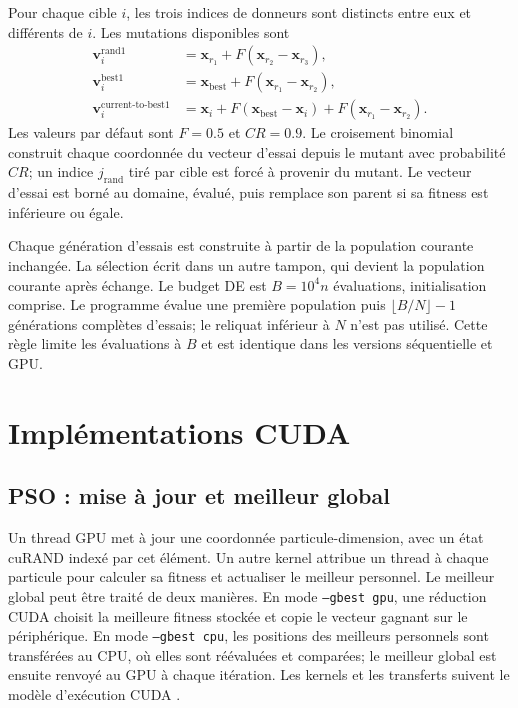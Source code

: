 \documentclass[conference]{IEEEtran}
\newcommand{\DE}{\textsc{DE}}
\begin{document}
Pour chaque cible $i$, les trois indices de donneurs sont distincts entre eux
et différents de $i$. Les mutations disponibles sont
\begin{align}
\mathbf{v}_i^{\mathrm{rand1}} &=
\mathbf{x}_{r_1}+F(\mathbf{x}_{r_2}-\mathbf{x}_{r_3}),\\
\mathbf{v}_i^{\mathrm{best1}} &=
\mathbf{x}_{\mathrm{best}}+F(\mathbf{x}_{r_1}-\mathbf{x}_{r_2}),\\
\mathbf{v}_i^{\mathrm{current\text{-}to\text{-}best1}} &=
\mathbf{x}_i+F(\mathbf{x}_{\mathrm{best}}-\mathbf{x}_i)
+F(\mathbf{x}_{r_1}-\mathbf{x}_{r_2}).
\end{align}
Les valeurs par défaut sont $F=0.5$ et $CR=0.9$. Le croisement binomial
construit chaque coordonnée du vecteur d'essai depuis le mutant avec
probabilité $CR$; un indice $j_{\mathrm{rand}}$ tiré par cible est forcé à
provenir du mutant. Le vecteur d'essai est borné au domaine, évalué, puis
remplace son parent si sa fitness est inférieure ou égale.

Chaque génération d'essais est construite à partir de la population courante
inchangée. La sélection écrit dans un autre tampon, qui devient la population
courante après échange. Le budget \DE{} est $B=10^4n$ évaluations, initialisation
comprise. Le programme évalue une première population puis
$\lfloor B/N\rfloor-1$ générations complètes d'essais; le reliquat inférieur
à $N$ n'est pas utilisé. Cette règle limite les évaluations à $B$ et est
identique dans les versions séquentielle et GPU.

\section{Implémentations CUDA}
\label{sec:cuda}

\subsection{PSO : mise à jour et meilleur global}
\label{sec:pso-cuda}

Un thread GPU met à jour une coordonnée particule-dimension, avec un état
cuRAND indexé par cet élément. Un autre kernel attribue un thread à chaque
particule pour calculer sa fitness et actualiser le meilleur personnel. Le
meilleur global peut être traité de deux manières. En mode
\texttt{--gbest gpu}, une réduction CUDA choisit la meilleure fitness stockée
et copie le vecteur gagnant sur le périphérique. En mode
\texttt{--gbest cpu}, les positions des meilleurs personnels sont transférées
au CPU, où elles sont réévaluées et comparées; le meilleur global est ensuite
renvoyé au GPU à chaque itération.
Les kernels et les transferts suivent le modèle d'exécution CUDA
\cite{nvidiaCudaGuide}.
\end{document}
